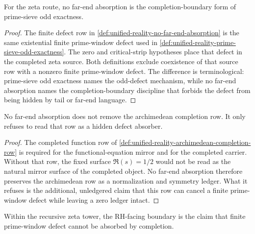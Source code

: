 \begin{theorem}
\label{thm:unified-reality-no-far-end-absorption-prime-sieve-exactness}
For the zeta route, no far-end absorption is the completion-boundary
form of prime-sieve odd exactness.
\end{theorem}

\begin{proof}
The finite defect row in
\autoref{def:unified-reality-no-far-end-absorption} is the same
existential finite prime-window defect used in
\autoref{def:unified-reality-prime-sieve-odd-exactness}.  The zero and
critical-strip hypotheses place that defect in the completed zeta
source.  Both definitions exclude coexistence of that source row with a
nonzero finite prime-window defect.  The difference is terminological:
prime-sieve odd exactness names the odd-defect mechanism, while no
far-end absorption names the completion-boundary discipline that forbids
the defect from being hidden by tail or far-end language.
\end{proof}

\begin{theorem}
\label{thm:unified-reality-archimedean-normalization-retained}
No far-end absorption does not remove the archimedean completion row.
It only refuses to read that row as a hidden defect absorber.
\end{theorem}

\begin{proof}
The completed function row of
\autoref{def:unified-reality-archimedean-completion-row} is required for
the functional-equation mirror and for the completed carrier.  Without
that row, the fixed surface $\Re(s)=1/2$ would not be read as the
natural mirror surface of the completed object.  No far-end absorption
therefore preserves the archimedean row as a normalization and symmetry
ledger.  What it refuses is the additional, unledgered claim that this
row can cancel a finite prime-window defect while leaving a zero ledger
intact.
\end{proof}

\begin{corollary}
\label{cor:unified-reality-no-far-end-absorption-rh-boundary}
Within the recursive zeta tower, the RH-facing boundary is the claim that
finite prime-window defect cannot be absorbed by completion.
\end{corollary}

